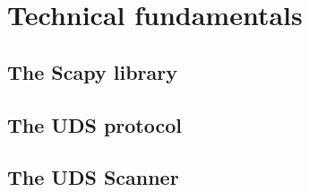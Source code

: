 \section{Technical fundamentals}

\subsection{The Scapy library}

\subsection{The UDS protocol}

\subsection{The UDS Scanner}
